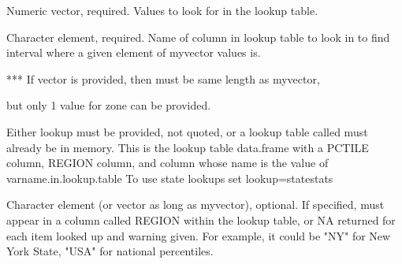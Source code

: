 \documentclass[a4paper]{book}
\begin{document}
%
\begin{Arguments}
\begin{ldescription}
\item[\code{myvector}] Numeric vector, required. Values to look for in the lookup table.

\item[\code{varname.in.lookup.table}] Character element, required.
Name of column in lookup table to look in
to find interval where a given element of myvector values is.

*** If vector is provided, then must be same length as myvector,

but only 1 value for zone can be provided.

\item[\code{lookup}] Either lookup must be provided, not quoted,
or a lookup table called  must already be in memory. This is the lookup table
data.frame with a PCTILE column, REGION column, and column whose name is the value of varname.in.lookup.table
To use state lookups set lookup=statestats

\item[\code{zone}] Character element (or vector as long as myvector), optional.
If specified, must appear in a column called REGION within the lookup table,
or NA returned for each item looked up and warning given.
For example, it could be "NY" for New York State, "USA" for national percentiles.
\end{ldescription}
\end{Arguments}
%
\end{document}
